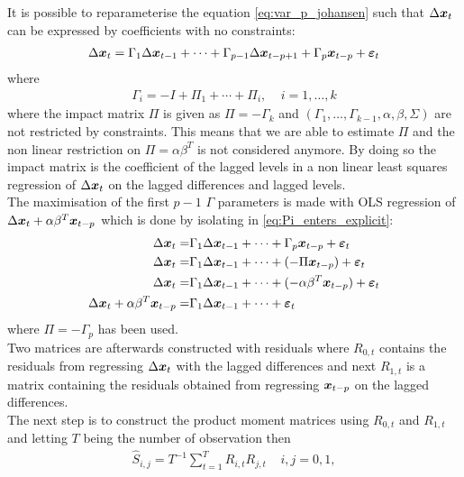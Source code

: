 \noindent It is possible to reparameterise the equation \eqref{eq:var_p_johansen} such that $\Delta \boldsymbol{x}_t$ can be expressed by coefficients with no constraints:
\begin{align}\label{eq:Pi_enters_explicit}
    \Delta \boldsymbol{x}_t=\Gamma_1\Delta \boldsymbol{x}_{t-1}+\cdots+\Gamma_{p-1}\Delta \boldsymbol{x}_{t-p+1}+\Gamma_{p}\boldsymbol{x}_{t-p}+\boldsymbol{\varepsilon}_t
\end{align}
where 
\begin{align*}
    \Gamma_i=-I+\Pi_1+\cdots+\Pi_i,\;\;\;\; i=1,\ldots,k
\end{align*}
where the impact matrix $\Pi$ is given as $\Pi=-\Gamma_k$ and $(\Gamma_1,\ldots,\Gamma_{k-1},\alpha,\beta,\Sigma)$ are not restricted by constraints. This means that we are able to estimate $\Pi$ and the non linear restriction on $\Pi=\alpha\beta^T$ is not considered anymore. By doing so the impact matrix is the coefficient of the lagged levels in a non linear least squares regression of $\Delta \boldsymbol{x}_t$ on the lagged differences and lagged levels.\\
\noindent The maximisation of the first $p-1$ $\Gamma$ parameters is made with OLS regression of $\Delta \boldsymbol{x}_t+\alpha\beta^T \boldsymbol{x}_{t-p}$ which is done by isolating in \eqref{eq:Pi_enters_explicit}:
\begin{align}
    \Delta \boldsymbol{x}_t=&\Gamma_1\Delta \boldsymbol{x}_{t-1}+\cdots+\Gamma_{p}\boldsymbol{x}_{t-p}+\boldsymbol{\varepsilon}_t\\
    \Delta \boldsymbol{x}_t=&\Gamma_1\Delta \boldsymbol{x}_{t-1}+\cdots+(-\Pi \boldsymbol{x}_{t-p})+\boldsymbol{\varepsilon}_t\\
    \Delta \boldsymbol{x}_t=&\Gamma_1\Delta \boldsymbol{x}_{t-1}+\cdots+(-\alpha\beta^T \boldsymbol{x}_{t-p})+\boldsymbol{\varepsilon}_t\\
    \Delta \boldsymbol{x}_t+\alpha\beta^T \boldsymbol{x}_{t-p}=&\Gamma_1\Delta \boldsymbol{x}_{t-1}+\cdots+\boldsymbol{\varepsilon}_t
\end{align}
where $\Pi=-\Gamma_p$ has been used.\\
Two matrices are afterwards constructed with residuals where $R_{0,t}$ contains the residuals from regressing $\Delta \boldsymbol{x}_t$ with the lagged differences and next $R_{1,t}$ is a matrix containing the residuals obtained from regressing $\boldsymbol{x}_{t-p}$ on the lagged differences.\\
The next step is to construct the product moment matrices using $R_{0,t}$ and $R_{1,t}$ and letting $T$ being the number of observation then
\begin{align}\label{eq:prod_mom_mat}
\hat{S}_{i,j}=T^{-1}\sum_{t=1}^T R_{i,t}R_{j,t}\;\;\;\; i,j=0,1,
\end{align}
